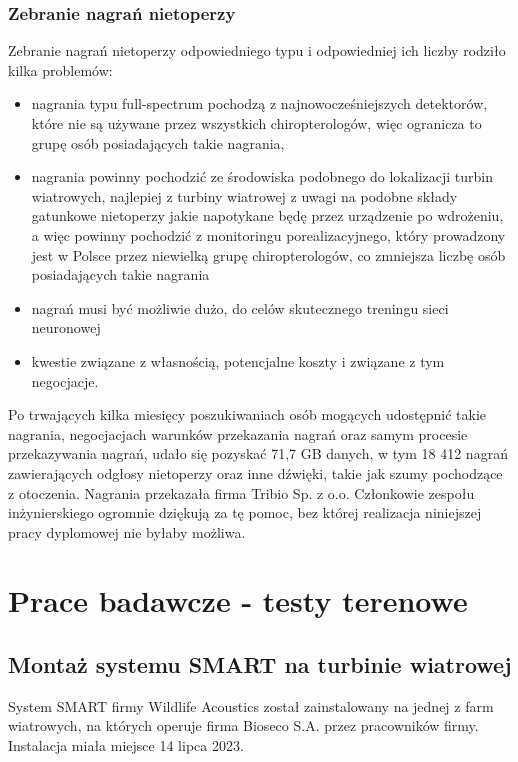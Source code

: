 \documentclass{sprz}
\begin{document}
\subsection{Zebranie nagrań nietoperzy}
Zebranie nagrań nietoperzy odpowiedniego typu i odpowiedniej ich liczby rodziło kilka problemów:
\begin{itemize}
  \item{nagrania typu full-spectrum pochodzą z najnowocześniejszych detektorów, które nie są używane przez wszystkich chiropterologów, więc ogranicza to grupę osób posiadających takie nagrania,}
  \item{nagrania powinny pochodzić ze środowiska podobnego do lokalizacji turbin wiatrowych, najlepiej z turbiny wiatrowej z uwagi na podobne składy gatunkowe nietoperzy jakie napotykane będę przez urządzenie po wdrożeniu, a więc powinny pochodzić z monitoringu porealizacyjnego, który prowadzony jest w Polsce przez niewielką grupę chiropterologów, co zmniejsza liczbę osób posiadających takie nagrania}
  \item{nagrań musi być możliwie dużo, do celów skutecznego treningu sieci neuronowej}
  \item{kwestie związane z własnością, potencjalne koszty i związane z tym negocjacje.}
\end{itemize}

Po trwających kilka miesięcy poszukiwaniach osób mogących udostępnić takie nagrania, negocjacjach warunków przekazania nagrań oraz samym procesie przekazywania nagrań, udało się pozyskać 71,7 GB danych, w tym 18 412 nagrań zawierających odgłosy nietoperzy oraz inne dźwięki, takie jak szumy pochodzące z otoczenia. Nagrania przekazała firma Tribio Sp. z o.o. Członkowie zespołu inżynierskiego ogromnie dziękują za tę pomoc, bez której realizacja niniejszej pracy dyplomowej nie byłaby możliwa.

\chapter{Prace badawcze - testy terenowe}

\section{Montaż systemu SMART na turbinie wiatrowej}
System SMART firmy Wildlife Acoustics został zainstalowany na jednej z farm wiatrowych, na których operuje firma Bioseco S.A. przez pracowników firmy. Instalacja miała miejsce 14 lipca 2023. 
 
\end{document}
